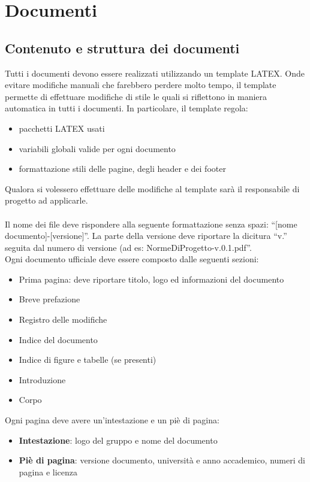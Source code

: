 \section{Documenti}{
	\label{sec:docs}
	\subsection{Contenuto e struttura dei documenti}{
		\label{sub:content}
		Tutti i documenti devono essere realizzati utilizzando un template LATEX. Onde evitare modifiche manuali che farebbero perdere molto tempo, il template permette di effettuare modifiche di stile le quali si riflettono in maniera automatica in tutti i documenti. In particolare, il template regola:
		\begin{itemize}
			\item pacchetti LATEX usati
			\item variabili globali valide per ogni documento
			\item formattazione stili delle pagine, degli header e dei footer
		\end{itemize}
		Qualora si volessero effettuare delle modifiche al template sar\`{a} il responsabile di progetto ad applicarle.\\
		\\
		Il nome dei file deve rispondere alla seguente formattazione senza spazi: “[nome documento]-[versione]”. La parte della versione deve riportare la dicitura “v.” seguita dal numero di versione (ad es: NormeDiProgetto-v.0.1.pdf”.\\
		Ogni documento ufficiale deve essere composto dalle seguenti sezioni:
		\begin{itemize}
			\item Prima pagina: deve riportare titolo, logo ed informazioni del documento
			\item Breve prefazione
			\item Registro delle modifiche
			\item Indice del documento
			\item Indice di figure e tabelle (se presenti)
			\item Introduzione
			\item Corpo
		\end{itemize}
		Ogni pagina deve avere un'intestazione e un pi\`{e} di pagina:
		\begin{itemize}
			\item \textbf{Intestazione}: logo del gruppo e nome del documento
			\item \textbf{Pi\`{e} di pagina}: versione documento, universit\`{a} e anno accademico, numeri di pagina e licenza

\end{itemize}}}
